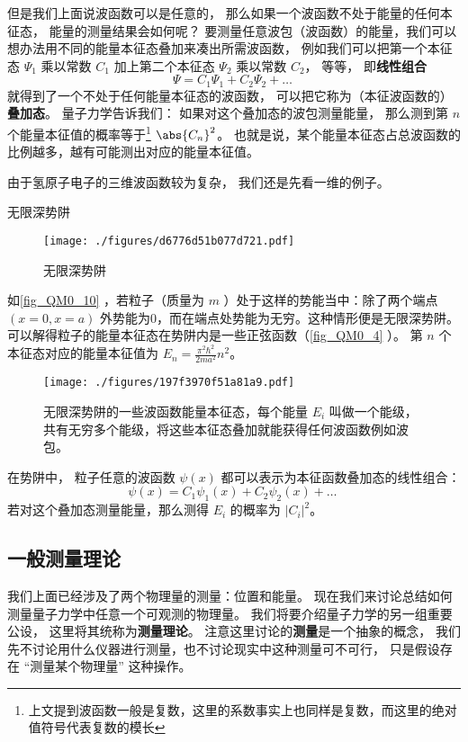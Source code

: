 但是我们上面说波函数可以是任意的， 那么如果一个波函数不处于能量的任何本征态， 能量的测量结果会如何呢？ 要测量任意波包（波函数）的能量，我们可以想办法用不同的能量本征态叠加来凑出所需波函数， 例如我们可以把第一个本征态 $\Psi_1$ 乘以常数 $C_1$ 加上第二个本征态 $\Psi_2$ 乘以常数 $C_2$， 等等， 即\textbf{线性组合}
\begin{equation}
\Psi = C_1\Psi_1 + C_2\Psi_2 + \dots~
\end{equation}
就得到了一个不处于任何能量本征态的波函数， 可以把它称为（本征波函数的）\textbf{叠加态}。 量子力学告诉我们： 如果对这个叠加态的波包测量能量， 那么测到第 $n$ 个能量本征值的概率等于\footnote{上文提到波函数一般是复数，这里的系数事实上也同样是复数，而这里的绝对值符号代表复数的模长} $\abs{C_n}^2$。 也就是说，某个能量本征态占总波函数的比例越多，越有可能测出对应的能量本征值。

由于氢原子电子的三维波函数较为复杂， 我们还是先看一维的例子。

\begin{example}{无限深势阱}
\begin{figure}[ht]
\centering
\texttt{[image: ./figures/d6776d51b077d721.pdf]}
\caption{无限深势阱} \label{fig_QM0_10}
\end{figure}
如\autoref{fig_QM0_10} ，若粒子（质量为 $m$ ）处于这样的势能当中：除了两个端点 $(x=0,x=a)$ 外势能为0，而在端点处势能为无穷。这种情形便是无限深势阱。 可以解得粒子的能量本征态在势阱内是一些正弦函数（\autoref{fig_QM0_4} ）。 第 $n$ 个本征态对应的能量本征值为 $E_n=\frac{\pi^2\hbar^2}{2ma^2}n^2$。

\begin{figure}[ht]
\centering
\texttt{[image: ./figures/197f3970f51a81a9.pdf]}
\caption{无限深势阱的一些波函数能量本征态，每个能量 $E_i$ 叫做一个能级，共有无穷多个能级，将这些本征态叠加就能获得任何波函数例如波包。} \label{fig_QM0_4}
\end{figure}

在势阱中， 粒子任意的波函数 $\psi(x)$ 都可以表示为本征函数叠加态的线性组合：
\begin{equation}
\psi(x) = C_1\psi_1(x) + C_2\psi_2(x) + \dots~
\end{equation}
若对这个叠加态测量能量，那么测得 $E_i$ 的概率为 $|C_i|^2$。
\end{example}


\subsection{一般测量理论}
我们上面已经涉及了两个物理量的测量：位置和能量。 现在我们来讨论总结如何测量量子力学中任意一个可观测的物理量。 我们将要介绍量子力学的另一组重要公设， 这里将其统称为\textbf{测量理论}。 注意这里讨论的\textbf{测量}是一个抽象的概念， 我们先不讨论用什么仪器进行测量，也不讨论现实中这种测量可不可行， 只是假设存在 “测量某个物理量” 这种操作。

